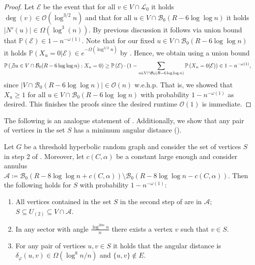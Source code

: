 \documentclass[letterpaper,11pt]{article}
\newcommand{\Pro}[1]{\mathbb{P}\left(#1\right)}
\newcommand{\wehp}{w.e.h.p.\xspace}
\newcommand{\B}{\mathcal B}
\newcommand{\1}{\mathbb I}
\newcommand{\bigO}{\mathcal{O}}
\newcommand{\Layer}[1]{\mathcal{L}_{#1}}
\newcommand{\angulardist}[2]{\delta_\varphi(#1,#2)}
\begin{document}
\begin{proof}
Let $\mathcal{E}$ be the event that for all $v \in V \cap \Layer{0}$ it holds $\deg(v) \in \bigO(\log^{3/2}n)$ and that for all $u \in V \cap \B_0(R- 6\log\log n)$ it holds $|N'(u)| \in \Omega(\log^3(n))$. By previous discussion it follows via union bound that $\Pro{\mathcal{E}} \in 1 - n^{-\omega(1)}$. Note that for our fixed $u \in V \cap \B_0(R- 6\log\log n)$ it holds $\Pro{X_u = 0 |\mathcal{E}} \in e^{-\Omega(\log^{3/2}n)}$ by . Hence, we obtain using a union bound
%
\begin{align*}
 \Pro{\not\exists u  \in V \cap \B_0(R- 6\log\log n) : X_u = 0} \geq \Pro{\mathcal{E}}\cdot(1 - \sum_{u \in V \cap \B_0(R- 6\log\log n) }\Pro{X_u = 0|\mathcal{E}}) \in 1-n^{-\omega(1)},
\end{align*}
%
since $|V \cap \B_0(R- 6\log\log n)| \in \bigO(n)$ \wehp That is, we showed that $X_u \geq 1$ for all $u  \in V \cap \B_0(R- 6\log\log n)$ with probability $1 - n^{-\omega(1)}$ as desired. This finishes the proofs since the desired runtime $\bigO(1)$ is immediate.
\end{proof}
%
The following is an analogue statement of . Additionally, we show that any pair of vertices in the set $S$ has a minimum angular distance ().
%
\begin{lemma} \label{lem:cheddar20}
    Let $G$ be a threshold hyperbolic random graph and consider the set of vertices $S$ in step 2 of \algos. Moreover, let $c(C, \alpha)$ be a constant large enough and consider annulus $\mathcal{A} \coloneq \B_0(R - {8\log\log n} + c(C, \alpha))\setminus \B_0(R - {8\log\log n} - c(C, \alpha))$. Then the following holds for $S$ with probability $1 - n^{-\omega(1)}$:

    \begin{enumerate}
        \item\label{item:ring2} All vertices contained in the set $S$ in the second step of \algos are in $\mathcal{A}$; $S \subseteq U_{(2)} \subseteq V \cap \mathcal{A}$.

        \item\label{item:active-sector2} In any sector with angle $\frac{\log^{30\alpha}n}{n}$ there exists a vertex $v$ such that $v \in S$.
        \item\label{item:min_angle} For any pair of vertices $u,v \in S$ it holds that the angular distance is $\angulardist{u}{v} \in \Omega(\log^8 n / n)$ and $\{u,v\}\not\in E.$
       
    \end{enumerate}
\end{lemma}
\end{document}
